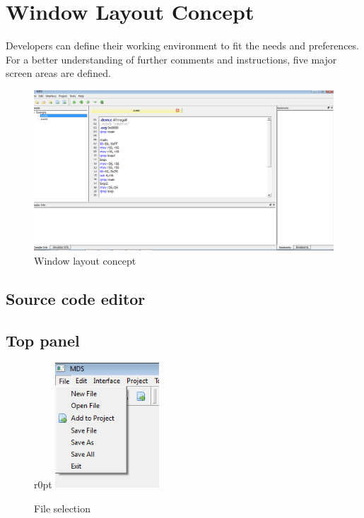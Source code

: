 
         \section{Window Layout Concept}
          Developers can define their working environment to fit the needs and
          preferences. For a better understanding of further comments and instructions,
          five major screen areas are defined. %
               \begin{figure}
                      \centering
                      \includegraphics [scale=0.3]{img/Demonstration_project.png}
                      \caption{Window layout concept}
               \end{figure}

                \subsection{Source code editor}
                \subsection{Top panel}
                        \begin{figure}{r}{0pt}
                                \centering
                                \includegraphics[width=110pt]{img/menu_file.png}
                                \caption{File selection}
                        \end{figure}

